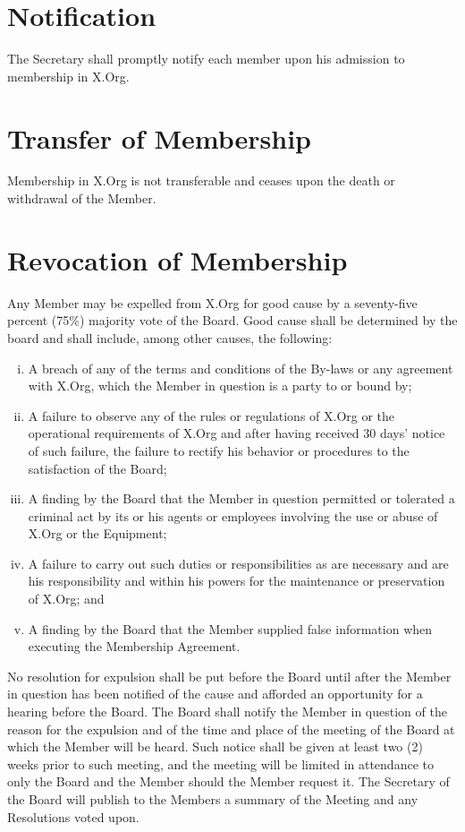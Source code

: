 \documentclass[10pt, english]{bylaws}
\begin{document}
\section{Notification}
The Secretary shall promptly notify each member upon his admission to membership
in X.Org.

\section{Transfer of Membership}
Membership in X.Org is not transferable and ceases upon the death or withdrawal
of the Member.

\section{Revocation of Membership}
Any Member may be expelled from X.Org for good cause by a seventy-five percent
(75\%) majority vote of the Board. Good cause shall be determined by the board
and shall include, among other causes, the following:

\begin{enumerate}[(i)\hspace{.2cm}]
	\item A breach of any of the terms and conditions of the By-laws or any
	agreement with X.Org, which the Member in question is a party to or
	bound by;

	\item A failure to observe any of the rules or regulations of X.Org or
	the operational requirements of X.Org and after having received 30
	days' notice of such failure, the failure to rectify his behavior or
	procedures to the satisfaction of the Board;

	\item A finding by the Board that the Member in question permitted or
	tolerated a criminal act by its or his agents or employees involving
	the use or abuse of X.Org or the Equipment;

	\item A failure to carry out such duties or responsibilities as are
	necessary and are his responsibility and within his powers for the
	maintenance or preservation of X.Org; and

	\item A finding by the Board that the Member supplied false information
	when executing the Membership Agreement.
\end{enumerate}

No resolution for expulsion shall be put before the Board until after the Member
in question has been notified of the cause and afforded an opportunity for a
hearing before the Board. The Board shall notify the Member in question of the
reason for the expulsion  and of the time and place of the meeting of the Board
at which the Member will be heard. Such notice shall be given at least two (2)
weeks prior to such meeting, and the meeting will be limited in attendance to
only the Board and the Member should the Member request it. The Secretary of the
Board will publish to the Members a summary of the Meeting and any Resolutions
voted upon.
\end{document}
